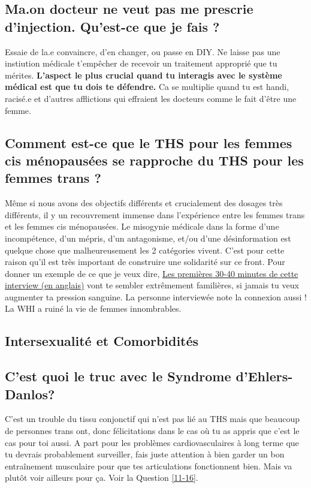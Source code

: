 \documentclass{article}
\begin{document}
\subsection{Ma.on docteur ne veut pas me prescrie d'injection. Qu'est-ce que je fais ?}

Essaie de la.e convaincre, d'en changer, ou passe en DIY. Ne laisse pas une instiution médicale t'empêcher de recevoir un traitement approprié que tu mérites. \textbf{L'aspect le plus crucial quand tu interagis avec le système médical est que tu dois te défendre.} Ca se multiplie quand tu est handi, racisé.e et d'autres afflictions qui effraient les docteurs comme le fait d'être une femme.

\subsection{Comment est-ce que le THS pour les femmes cis ménopausées se rapproche du THS pour les femmes trans ?}\label{11-29}

Même si nous avons des objectifs différents et crucialement des dosages très différents, il y un recouvrement immense dans l'expérience entre les femmes trans et les femmes cis ménopausées. Le misogynie médicale dans la forme d'une incompétence, d'un mépris, d'un antagonisme, et/ou d'une désinformation est quelque chose que malheureusement les 2 catégories vivent. C'est pour cette raison qu'il est très important de construire une solidarité sur ce front. Pour donner un exemple de ce que je veux dire, \href{https://www.youtube.com/watch?v=W0XW6av2wLQ}{Les premières 30-40 minutes de cette interview (en anglais)} vont te sembler extrêmement familières, si jamais tu veux augmenter ta pression sanguine. La personne interviewée note la connexion aussi ! La WHI a ruiné la vie de femmes innombrables.

\subsection*{Intersexualité et Comorbidités}

\subsection{C'est quoi le truc avec le Syndrome d'Ehlers-Danlos?}

C'est un trouble du tissu conjonctif qui n'est pas lié au THS mais que beaucoup de personnes trans ont, donc félicitations dans le cas où tu as appris que c'est le cas pour toi aussi. A part pour les problèmes cardiovasculaires à long terme que tu devrais probablement surveiller, fais juste attention à bien garder un bon entraînement musculaire pour que tes articulations fonctionnent bien. Mais va plutôt voir ailleurs pour ça. Voir la Question \ref{11-16}.
\end{document}
